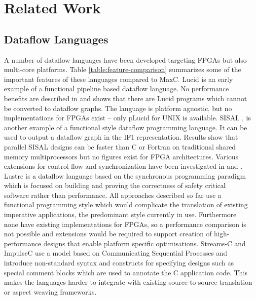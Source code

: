 \section{Related Work}

\subsection{Dataflow Languages}

A number of dataflow languages have been developed targeting FPGAs but
also multi-core platforms. Table \ref{table:feature-comparison}
summarizes some of the important features of these languages compared
to MaxC. Lucid \cite{ashcroft1977lucid} is an early example of a
functional pipeline based dataflow language. No performance benefits
are described in \cite{ashcroft1977lucid} and \cite{ashcroft1980some}
shows that there are Lucid programs which cannot be converted to
dataflow graphs. The language is platform agnostic, but no
implementations for FPGAs exist -- only pLucid \cite{pLucid} for UNIX
is available. SISAL \cite{gurd1987implicit}, \cite{mcgraw1983sisal} is
another example of a functional style dataflow programming
language. It can be used to output a dataflow graph in the IF1
representation. Results show that parallel SISAL designs can be faster
\cite{archambault2010fine} than C or Fortran on traditional shared
memory multiprocessors but no figures exist for FPGA
architectures. Various extensions for control flow and synchronization
have been investigated in \cite{143862} and \cite{183202}. Lustre
\cite{halbwachs1991synchronous} is a dataflow language based on the
synchronous programming paradigm which is focused on building and
proving the correctness of safety critical software
\cite{halbwachs1992programming} rather than performance.  All
approaches described so far use a functional programming style which
would complicate the translation of existing imperative applications,
the predominant style currently in use. Furthermore none have existing
implementations for FPGAs, so a performance comparison is not possible
and extensions would be required to support creation of
high-performance designs that enable platform specific optimisations.
Streams-C\cite{Gokhale:Stone:Arnold:Kalinowski:2000} and
ImpulseC\cite{ImpulseC} use a model based on Communicating Sequential
Processes and introduce non-standard syntax and constructs for
specifying designs such as special comment blocks which are used to
annotate the C application code. This makes the languages harder to
integrate with existing source-to-source translation or aspect weaving
frameworks.

